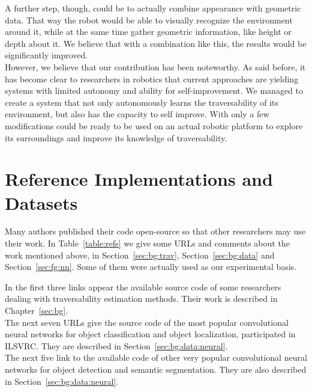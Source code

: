 \documentclass[12pt,a4paper,table,dvipsnames,tikz]{report}
\newcommand{\acronym}{\MakeUppercase}
\newcommand{\bl}[1]{{\hypersetup{linkcolor=blue}#1}}
\begin{document}
	
	A further step, though, could be to actually combine appearance with geometric 
	data. That way the robot would be able to visually recognize the environment 
	around it, while at the same time gather geometric information, like height or 
	depth about it. We believe that with a combination like this, the results would 
	be significantly improved.
	\\
	
	However, we believe that our contribution has been noteworthy. As said before, it 
	has become clear to researchers in robotics that current approaches are yielding 
	systems with limited autonomy and ability for self-improvement. We managed to 
	create a system that not only autonomously learns the traversability of its 
	environment, but also has the capacity to self improve. With only a few modifications 
	could be ready to be used on an actual robotic platform to explore its surroundings 
	and improve its knowledge of traversability.
	
	
	
	\appendix
	\chapter{Reference Implementations and Datasets}
	\label{app:urls}
	
	Many authors published their code open-source so that other researchers may 
	use their work. In Table~\bl{\ref{table:refs}} we give some \acronym{url}s and 
	comments about the work mentioned above, in Section~\ref{sec:bg:trav}, 
	Section~\ref{sec:bg:data} and Section~\ref{sec:fg:nn}. Some of them were 
	actually used as our experimental basis.
	\\
	
	\begin{table}[h]
		\centering	
			
	\end{table}
	
	In the first three links appear the available source code of some researchers dealing 
	with traversability estimation methods. Their work is described in Chapter~\ref{sec:bg}.
	\\
	
	The next seven \acronym{url}s give the source code of the most popular convolutional 
	neural networks for object classification and object localization, participated in 
	\acronym{ilsvrc}. They are described in Section~\ref{sec:bg:data:neural}.
	\\
	
	The next five link to the available code of other very popular convolutional neural 
	networks for object detection and semantic segmentation. They are also described in 
	Section~\ref{sec:bg:data:neural}.
	\\
	
\end{document}
